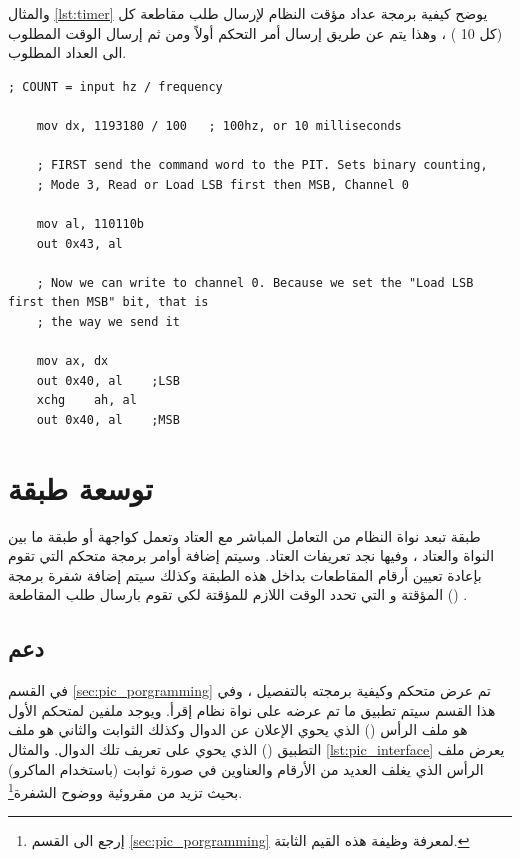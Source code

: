 \documentclass[document.tex]{subfiles}
\begin{document}
والمثال \ref{lst:timer} يوضح كيفية برمجة عداد مؤقت النظام لإرسال طلب مقاطعة كل  (كل 10 ) ، وهذا يتم عن طريق إرسال أمر التحكم أولاً ومن ثم إرسال الوقت المطلوب الى العداد المطلوب.

\begin{english}

\lstset{numberstyle=\tiny,numbers=left,stepnumber=1,numbersep=5pt,tabsize=2,extendedchars=true,breaklines=true,frame=b,showspaces=false, showtabs=false,xleftmargin=10pt,framexleftmargin=10pt,framexrightmargin=5pt,framexbottommargin=4pt,showstringspaces=false,language=[x86masm]Assembler}


\begin{lstlisting}[label=lst:timer,caption=\en{PIT programming}]
       ; COUNT = input hz / frequency
 
	mov	dx, 1193180 / 100	; 100hz, or 10 milliseconds
 
	; FIRST send the command word to the PIT. Sets binary counting,
	; Mode 3, Read or Load LSB first then MSB, Channel 0
 
	mov	al, 110110b
	out	0x43, al
 
	; Now we can write to channel 0. Because we set the "Load LSB first then MSB" bit, that is
	; the way we send it
 
	mov	ax, dx
	out	0x40, al	;LSB
	xchg	ah, al
	out	0x40, al	;MSB
\end{lstlisting}
\end{english}


\section{توسعة طبقة }
طبقة  تبعد نواة النظام من التعامل المباشر مع العتاد وتعمل كواجهة أو طبقة ما بين النواة والعتاد ، وفيها نجد تعريفات العتاد. وسيتم إضافة أوامر برمجة متحكم  التي تقوم بإعادة تعيين أرقام المقاطعات بداخل هذه الطبقة وكذلك سيتم إضافة شفرة برمجة المؤقتة و التي تحدد الوقت اللازم للمؤقتة لكي تقوم بارسال طلب المقاطعة () . 

\subsection{دعم }
في القسم \ref{sec:pic_porgramming} تم عرض متحكم  وكيفية برمجته بالتفصيل ، وفي هذا القسم سيتم تطبيق ما تم عرضه على نواة نظام إقرأ. ويوجد ملفين لمتحكم  الأول هو ملف الرأس () الذي يحوي الإعلان عن الدوال وكذلك الثوابت والثاني هو ملف التطبيق () الذي يحوي على تعريف تلك الدوال. والمثال \ref{lst:pic_interface} يعرض ملف الرأس الذي يغلف العديد من الأرقام والعناوين في صورة ثوابت (باستخدام الماكرو) بحيث تزيد من مقروئية ووضوح الشفرة\footnote{إرجع الى القسم \ref{sec:pic_porgramming} لمعرفة وظيفة هذه القيم الثابتة.}.
\end{document}
